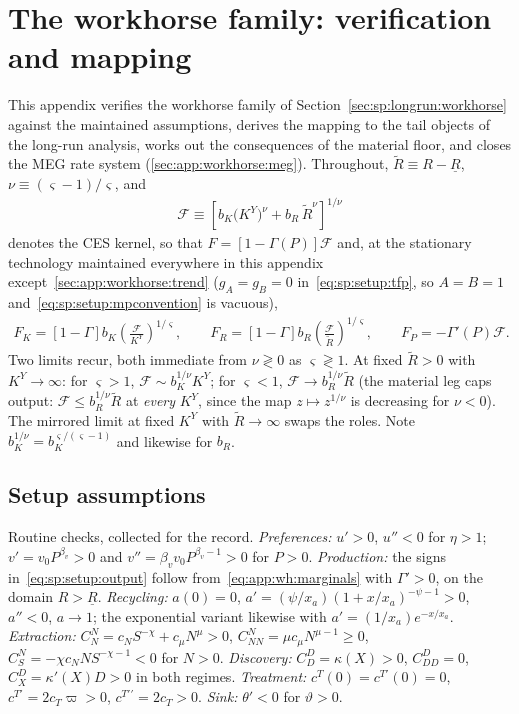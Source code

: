 \section{The workhorse family: verification and mapping}\label{sec:app:workhorse}

This appendix verifies the workhorse family of Section~\ref{sec:sp:longrun:workhorse} against
the maintained assumptions, derives the mapping to the tail objects of the long-run analysis,
works out the consequences of the material floor, and closes the MEG rate system
(\ref{sec:app:workhorse:meg}). Throughout,
$\tilde R\equiv R-\underline R$, $\nu\equiv\left(\varsigma-1\right)/\varsigma$, and
\begin{align}
\mathcal F\equiv\left[b_K\big(K^Y\big)^{\nu}+b_R\,\tilde R^{\nu}\right]^{1/\nu}
\label{eq:app:wh:kernel}
\end{align}
denotes the CES kernel, so that $F=\left[1-\Gamma\!\left(P\right)\right]\mathcal F$ and, at
the stationary technology maintained everywhere in this appendix
except~\ref{sec:app:workhorse:trend} ($g_A=g_B=0$
in~\eqref{eq:sp:setup:tfp}, so $A=B=1$ and~\eqref{eq:sp:setup:mpconvention} is vacuous),
\begin{align}
F_K=\left[1-\Gamma\right]b_K\left(\frac{\mathcal F}{K^Y}\right)^{1/\varsigma},
\qquad
F_R=\left[1-\Gamma\right]b_R\left(\frac{\mathcal F}{\tilde R}\right)^{1/\varsigma},
\qquad
F_P=-\Gamma'\!\left(P\right)\mathcal F .
\label{eq:app:wh:marginals}
\end{align}
Two limits recur, both immediate from $\nu\gtrless0$ as $\varsigma\gtrless1$. At fixed
$\tilde R>0$ with $K^Y\to\infty$: for $\varsigma>1$, $\mathcal F\sim b_K^{1/\nu}K^Y$; for
$\varsigma<1$, $\mathcal F\to b_R^{1/\nu}\tilde R$ (the material leg caps output:
$\mathcal F\le b_R^{1/\nu}\tilde R$ at \emph{every} $K^Y$, since the map $z\mapsto z^{1/\nu}$
is decreasing for $\nu<0$). The mirrored limit at fixed $K^Y$ with $\tilde R\to\infty$ swaps
the roles. Note $b_K^{1/\nu}=b_K^{\varsigma/\left(\varsigma-1\right)}$ and likewise for $b_R$.

\subsection{Setup assumptions}\label{sec:app:workhorse:setup}

Routine checks, collected for the record. \emph{Preferences:} $u'>0$, $u''<0$ for $\eta>1$;
$v'=v_0P^{\beta_v}>0$ and $v''=\beta_vv_0P^{\beta_v-1}>0$ for $P>0$.
\emph{Production:} the signs in~\eqref{eq:sp:setup:output} follow
from~\eqref{eq:app:wh:marginals} with $\Gamma'>0$, on the domain $R>\underline R$.
\emph{Recycling:} $a\!\left(0\right)=0$, $a'=\left(\psi/x_a\right)\left(1+x/x_a\right)^{-\psi-1}>0$,
$a''<0$, $a\to1$; the exponential variant likewise with $a'=\left(1/x_a\right)e^{-x/x_a}$.
\emph{Extraction:} $C^N_N=c_NS^{-\chi}+c_\mu N^{\mu}>0$,
$C^N_{NN}=\mu c_\mu N^{\mu-1}\ge0$, $C^N_S=-\chi c_NNS^{-\chi-1}<0$ for $N>0$.
\emph{Discovery:} $C^D_D=\kappa\!\left(X\right)>0$, $C^D_{DD}=0$,
$C^D_X=\kappa'\!\left(X\right)D>0$ in both regimes.
\emph{Treatment:} $c^T\!\left(0\right)=c^{T\prime}\!\left(0\right)=0$,
$c^{T\prime}=2c_T\varpi>0$, $c^{T\prime\prime}=2c_T>0$.
\emph{Sink:} $\theta'<0$ for $\vartheta>0$.

